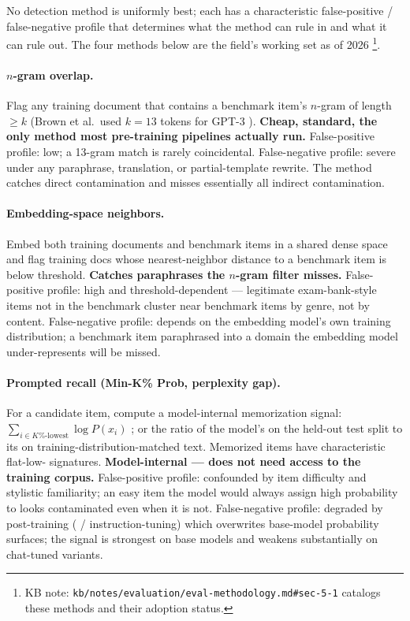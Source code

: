 No detection method is uniformly best; each has a characteristic
false-positive / false-negative profile that determines what the
method can rule in and what it can rule out. The four methods below
are the field's working set as of 2026%
\footnote{KB note: \texttt{kb/notes/evaluation/eval-methodology.md\#sec-5-1} catalogs these methods and their adoption status.}.

\paragraph{$n$-gram overlap.} Flag any training document that contains
a benchmark item's $n$-gram of length $\geq k$ (Brown et al.\ used
$k = 13$ tokens for GPT-3 ).
\textbf{Cheap, standard, the only method most pre-training pipelines
actually run.} False-positive profile: low; a 13-gram match is rarely
coincidental. False-negative profile: severe under any paraphrase,
translation, or partial-template rewrite. The method catches direct
contamination and misses essentially all indirect contamination.

\paragraph{Embedding-space neighbors.} Embed both training documents
and benchmark items in a shared dense space and flag training docs
whose nearest-neighbor distance to a benchmark item is below threshold.
\textbf{Catches paraphrases the $n$-gram filter misses.} False-positive
profile: high and threshold-dependent --- legitimate exam-bank-style
items not in the benchmark cluster near benchmark items by genre, not
by content. False-negative profile: depends on the embedding model's
own training distribution; a benchmark item paraphrased into a domain
the embedding model under-represents will be missed.

\paragraph{Prompted recall (Min-K\% Prob, perplexity gap).} For a
candidate item, compute a model-internal memorization signal:
$\sum_{i \in K\%\text{-lowest}} \log P(x_i)$ ;
or the ratio of the model's  on the held-out test split
to its  on training-distribution-matched text. Memorized
items have characteristic flat-low- signatures.
\textbf{Model-internal --- does not need access to the training corpus.}
False-positive profile: confounded by item difficulty and stylistic
familiarity; an easy item the model would always assign high
probability to looks contaminated even when it is not. False-negative
profile: degraded by post-training ( / instruction-tuning) which
overwrites base-model probability surfaces; the signal is strongest
on base models and weakens substantially on chat-tuned variants.

